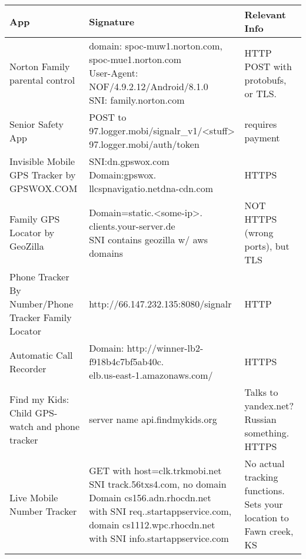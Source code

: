 \documentclass[acmtog]{acmart}
\begin{document}
\begin{table*}
\begin{tabular}{p{5cm}p{5cm}p{5cm}}
	\toprule
	App & Signature & Relevant Info \\
	\midrule
	Norton Family parental control & \makecell{domain: spoc-muw1.norton.com,\\spoc-mue1.norton.com\\
	User-Agent: NOF/4.9.2.12/Android/8.1.0\\
	SNI: family.norton.com} & HTTP POST with protobufs, or TLS. \\
	
	Senior Safety App & \makecell{POST to \\97.logger.mobi/signalr\_v1/<stuff>\\
	97.logger.mobi/auth/token} & requires payment\\
	
	Invisible Mobile GPS Tracker by
	GPSWOX.COM & \makecell{SNI:dn.gpswox.com\\ Domain:gpswox.\\llcspnavigatio.netdna-cdn.com} & HTTPS \\
	
	Family GPS Locator by GeoZilla & \makecell{Domain=static.<some-ip>.\\clients.your-server.de\\
	SNI contains geozilla w/ aws domains} & NOT HTTPS (wrong ports), but TLS \\
	
	Phone Tracker By Number/Phone Tracker Family Locator & http://66.147.232.135:8080/signalr & HTTP \\
	
	Automatic Call Recorder & \makecell{Domain: http://winner-lb2-\\f918b4c7bf5ab40c.\\elb.us-east-1.amazonaws.com/ }& HTTPS \\
	
	Find my Kids: Child GPS-watch and phone tracker & server name api.findmykids.org & Talks to yandex.net? Russian something. 
	HTTPS \\
	
	Live Mobile Number Tracker & \makecell{GET with host=clk.trkmobi.net\\
	SNI track.56txs4.com, no domain\\
	Domain cs156.adn.rhocdn.net\\ with SNI req..startappservice.com,\\
	domain cs1112.wpc.rhocdn.net\\ with SNI info.startappservice.com} & No actual tracking functions. Sets your location to Fawn creek, KS \\
	

\end{tabular}
\end{table*}
\end{document}
